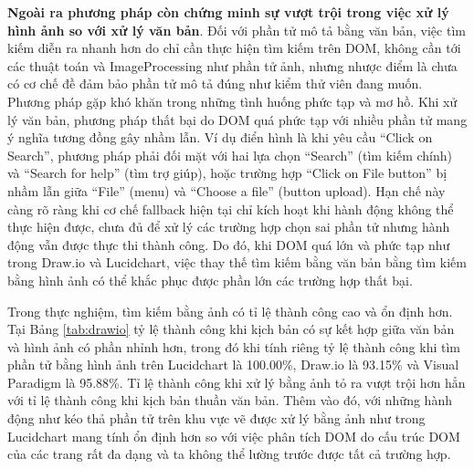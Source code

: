 \documentclass[a4paper, 12pt]{report}
\begin{document}
{\textbf{Ngoài ra phương pháp còn chứng minh sự vượt trội trong việc xử lý hình ảnh so với xử lý văn bản}.
Đối với phần tử mô tả bằng văn bản, việc tìm kiếm diễn ra nhanh hơn do chỉ cần thực hiện tìm kiếm trên DOM, không cần tới các thuật toán và \gls{ImageProcessing} như phần tử ảnh, nhưng nhược điểm là chưa có cơ chế đề đảm bảo phần tử mô tả đúng như kiểm thử viên đang muốn.  Phương pháp gặp khó khăn trong những tình huống phức tạp và mơ hồ. Khi xử lý văn bản, phương pháp thất bại do DOM quá phức tạp với nhiều phần tử mang ý nghĩa tương đồng gây nhầm lẫn. Ví dụ điển hình là khi yêu cầu ``Click on Search'', phương pháp phải đối mặt với hai lựa chọn ``Search'' (tìm kiếm chính) và ``Search for help'' (tìm trợ giúp), hoặc trường hợp ``Click on File button'' bị nhầm lẫn giữa ``File'' (menu) và ``Choose a file'' (button upload). Hạn chế này càng rõ ràng khi cơ chế fallback hiện tại chỉ kích hoạt khi hành động không thể thực hiện được, chưa đủ để xử lý các trường hợp chọn sai phần tử nhưng hành động vẫn được thực thi thành công. Do đó, khi DOM quá lớn và phức tạp như trong Draw.io và Lucidchart, việc thay thế tìm kiếm bằng văn bản bằng tìm kiếm bằng hình ảnh có thể khắc phục được phần lớn các trường hợp thất bại.



Trong thực nghiệm, tìm kiếm bằng ảnh có tỉ lệ thành công cao và ổn định hơn. Tại Bảng \ref{tab:drawio} tỷ lệ thành công khi kịch bản có sự kết hợp giữa văn bản và hình ảnh có phần nhỉnh hơn, trong đó khi tính riêng tỷ lệ thành công khi tìm phần tử bằng hình ảnh trên Lucidchart là 100.00\%, Draw.io là 93.15\% và Visual Paradigm là 95.88\%. Tỉ lệ thành công khi xử lý bằng ảnh tỏ ra vượt trội hơn hẳn với tỉ lệ thành công khi kịch bản thuần văn bản. Thêm vào đó, với những hành động như kéo thả phần tử trên khu vực vẽ được xử lý bằng ảnh như trong Lucidchart mang tính ổn định hơn so với việc phân tích DOM do cấu trúc DOM của các trang rất đa dạng và ta không thể lường trước được tất cả trường hợp.









}
\end{document}

